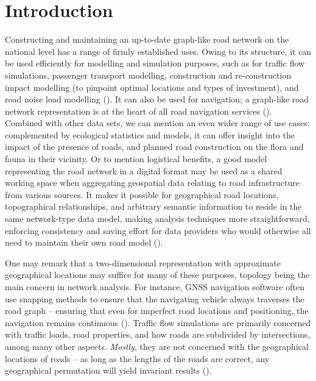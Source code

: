 
\section{Introduction}
\label{sec:i}

Constructing and maintaining an up-to-date graph-like road network on the national level has a range of firmly established uses. Owing to its structure, it can be used efficiently for modelling and simulation purposes, such as for traffic flow simulations, passenger transport modelling, construction and re-construction impact modelling (to pinpoint optimal locations and types of investment), and road noise load modelling (\cite{bell_iida_1997, zhu_li_2007, zhang_2011, duran_santos_2014, peng_etal_2020}). It can also be used for navigation; a graph-like road network representation is at the heart of all road navigation services (\cite{yue_etal_2008}). Combined with other data sets, we can mention an even wider range of use cases: complemented by ecological statistics and models, it can offer insight into the impact of the presence of roads, and planned road construction on the flora and fauna in their vicinity. Or to mention logistical benefits, a good model representing the road network in a digital format may be used as a shared working space when aggregating geospatial data relating to road infrastructure from various sources. It makes it possible for geographical road locations, topographical relationships, and arbitrary semantic information to reside in the same network-type data model, making analysis techniques more straightforward, enforcing consistency and saving effort for data providers who would otherwise all need to maintain their own road model (\cite{ekpenyong_etal_2007}).

One may remark that a two-dimensional representation with approximate geographical locations may suffice for many of these purposes, topology being the main concern in network analysis. For instance, GNSS navigation software often use snapping methods to ensure that the navigating vehicle always traverses the road graph – ensuring that even for imperfect road locations and positioning, the navigation remains continuous (\cite{fouque_bonnifait_2008, chen_hsu_2020}). Traffic flow simulations are primarily concerned with traffic loads, road properties, and how roads are subdivided by intersections, among many other aspects. \textit{Mostly}, they are not concerned with the geographical locations of roads – as long as the lengths of the roads are correct, any geographical permutation will yield invariant results (\cite{thomson_richardson_1995}).

